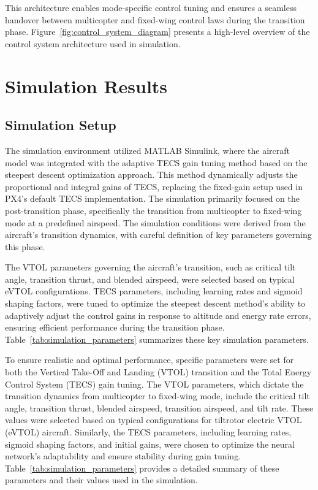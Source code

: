 \documentclass[journal,article,submit,pdftex,moreauthors]{Definitions/mdpi}
\begin{document}
This architecture enables mode-specific control tuning and ensures a seamless handover between multicopter and fixed-wing control laws during the transition phase. Figure~\ref{fig:control_system_diagram} presents a high-level overview of the control system architecture used in simulation.



\section{Simulation Results}
\subsection{Simulation Setup}
The simulation environment utilized MATLAB Simulink, where the aircraft model was integrated with the adaptive TECS gain tuning method based on the steepest descent optimization approach. This method dynamically adjusts the proportional and integral gains of TECS, replacing the fixed-gain setup used in PX4's default TECS implementation. The simulation primarily focused on the post-transition phase, specifically the transition from multicopter to fixed-wing mode at a predefined airspeed. The simulation conditions were derived from the aircraft's transition dynamics, with careful definition of key parameters governing this phase.

The VTOL parameters governing the aircraft's transition, such as critical tilt angle, transition thrust, and blended airspeed, were selected based on typical eVTOL configurations. TECS parameters, including learning rates and sigmoid shaping factors, were tuned to optimize the steepest descent method's ability to adaptively adjust the control gains in response to altitude and energy rate errors, ensuring efficient performance during the transition phase. Table~\ref{tab:simulation_parameters} summarizes these key simulation parameters.


To ensure realistic and optimal performance, specific parameters were set for both the Vertical Take-Off and Landing (VTOL) transition and the Total Energy Control System (TECS) gain tuning. The VTOL parameters, which dictate the transition dynamics from multicopter to fixed-wing mode, include the critical tilt angle, transition thrust, blended airspeed, transition airspeed, and tilt rate. These values were selected based on typical configurations for tiltrotor electric VTOL (eVTOL) aircraft. Similarly, the TECS parameters, including learning rates, sigmoid shaping factors, and initial gains, were chosen to optimize the neural network's adaptability and ensure stability during gain tuning. Table~\ref{tab:simulation_parameters} provides a detailed summary of these parameters and their values used in the simulation.
\end{document}
